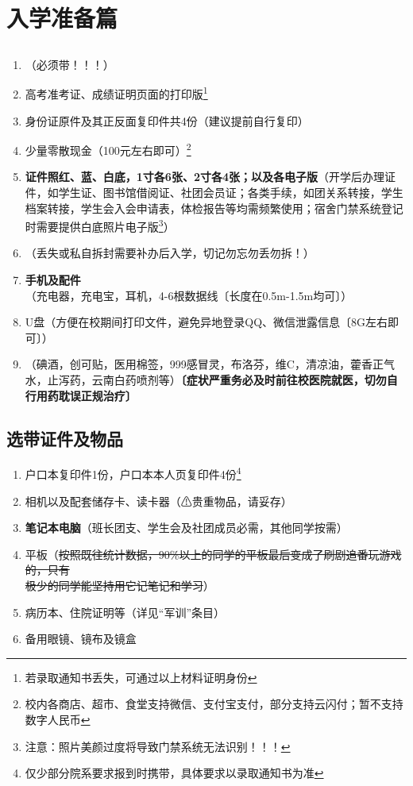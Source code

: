 \setlength{\parskip}{1em}
\chapter[入学准备篇]{入学准备篇}
\section[必要证件及物品]{}
\begin{enumerate}
    \item \textbf{}（必须带！！！）
    \item 高考准考证、成绩证明页面的打印版\footnote{若录取通知书丢失，可通过以上材料证明身份}
    \item 身份证原件及其正反面复印件共4份（建议提前自行复印）
    \item 少量零散现金（100元左右即可）\footnote{校内各商店、超市、食堂支持微信、支付宝支付，部分支持云闪付；暂不支持数字人民币}
    \item \textbf{证件照红、蓝、白底，1寸各6张、2寸各4张；以及各电子版}（开学后办理证件，如学生证、图书馆借阅证、社团会员证；各类手续，如团关系转接，学生档案转接，学生会入会申请表，体检报告等均需频繁使用；宿舍门禁系统登记时需要提供白底照片电子版\footnote{注意：照片美颜过度将导致门禁系统无法识别！！！}）
    \item \textbf{}（丢失或私自拆封需要补办后入学，切记勿忘勿丢勿拆！）
    \item \textbf{手机及配件}（充电器，充电宝，耳机，4-6根数据线〔长度在0.5m-1.5m均可〕）
    \item U盘（方便在校期间打印文件，避免异地登录QQ、微信泄露信息〔8G左右即可〕）
    \item \textbf{}（碘酒，创可贴，医用棉签，999感冒灵，布洛芬，维C，清凉油，藿香正气水，止泻药，云南白药喷剂等）\textbf{〔症状严重务必及时前往校医院就医，切勿自行用药耽误正规治疗〕}
\end{enumerate}

\section[选带证件及物品]{选带证件及物品}
\begin{enumerate}
    \item 户口本复印件1份，户口本本人页复印件4份\footnote{仅少部分院系要求报到时携带，具体要求以录取通知书为准}
    \item 相机以及配套储存卡、读卡器（⚠贵重物品，请妥存）
    \item \textbf{笔记本电脑}（班长团支、学生会及社团成员必需，其他同学按需）
    \item 平板（\sout{按照既往统计数据，90\%以上的同学的平板最后变成了刷剧追番玩游戏的，只有\\极少的同学能坚持用它记笔记和学习}）
    \item 病历本、住院证明等（详见“军训”条目）%
    \item 备用眼镜、镜布及镜盒
\end{enumerate}

